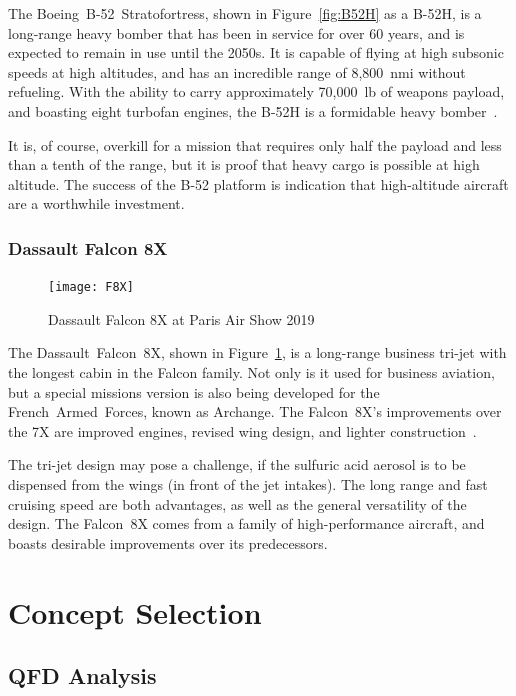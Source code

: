 \documentclass[12pt]{article}
\begin{document}
The Boeing~B-52~Stratofortress, shown in Figure~\ref{fig:B52H} as a B-52H, is a long-range heavy bomber that has been in service for over 60 years, and is expected to remain in use until the 2050s.
It is capable of flying at high subsonic speeds at high altitudes, and has an incredible range of 8,800~nmi without refueling.
With the ability to carry approximately 70,000~lb of weapons payload, and boasting eight turbofan engines, the B-52H is a formidable heavy bomber~\cite{Force:2019aa}.

It is, of course, overkill for a mission that requires only half the payload and less than a tenth of the range, but it is proof that heavy cargo is possible at high altitude.
The success of the B-52 platform is indication that high-altitude aircraft are a worthwhile investment.


\subsubsection{Dassault Falcon 8X}
\begin{figure}
	\centering
	\texttt{[image: F8X]}
	\caption{Dassault Falcon 8X at Paris Air Show 2019~\cite{pic:F8X}}
	\label{fig:F8X}
\end{figure}

The Dassault~Falcon~8X, shown in Figure~\ref{fig:F8X}, is a long-range business tri-jet with the longest cabin in the Falcon family.
Not only is it used for business aviation, but a special missions version is also being developed for the French~Armed~Forces, known as Archange.
The Falcon~8X's improvements over the 7X are improved engines, revised wing design, and lighter construction~\cite{Janes:2023aa}.

The tri-jet design may pose a challenge, if the sulfuric acid aerosol is to be dispensed from the wings (in front of the jet intakes).
The long range and fast cruising speed are both advantages, as well as the general versatility of the design.
The Falcon~8X comes from a family of high-performance aircraft, and boasts desirable improvements over its predecessors.


\section{Concept Selection}
\subsection{QFD Analysis}
\end{document}
